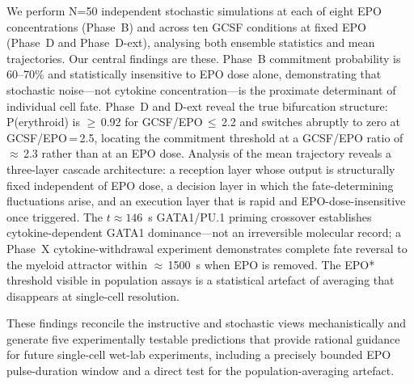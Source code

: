 We perform N=50 independent stochastic simulations at each of eight EPO concentrations (Phase~B) and across ten GCSF conditions at fixed EPO (Phase~D and Phase~D-ext), analysing both ensemble statistics and mean trajectories. Our central findings are these. Phase~B commitment probability is 60--70\% and statistically insensitive to EPO dose alone, demonstrating that stochastic noise---not cytokine concentration---is the proximate determinant of individual cell fate. Phase~D and D-ext reveal the true bifurcation structure: P(erythroid) is $\geq$\,0.92 for GCSF/EPO\,$\leq$\,2.2 and switches abruptly to zero at GCSF/EPO\,=\,2.5, locating the commitment threshold at a GCSF/EPO ratio of $\approx$\,2.3 rather than at an EPO dose. Analysis of the mean trajectory reveals a three-layer cascade architecture: a reception layer whose output is structurally fixed independent of EPO dose, a decision layer in which the fate-determining fluctuations arise, and an execution layer that is rapid and EPO-dose-insensitive once triggered. The $t\approx146$~s GATA1/PU.1 priming crossover establishes cytokine-dependent GATA1 dominance---not an irreversible molecular record; a Phase~X cytokine-withdrawal experiment demonstrates complete fate reversal to the myeloid attractor within $\approx$\,1500~s when EPO is removed. The EPO* threshold visible in population assays is a statistical artefact of averaging that disappears at single-cell resolution.

These findings reconcile the instructive and stochastic views mechanistically and generate five experimentally testable predictions that provide rational guidance for future single-cell wet-lab experiments, including a precisely bounded EPO pulse-duration window and a direct test for the population-averaging artefact.
